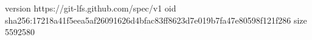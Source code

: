 version https://git-lfs.github.com/spec/v1
oid sha256:17218a41f5eea5af26091626d4bfac83ff8623d7e019b7fa47e80598f121f286
size 5592580
